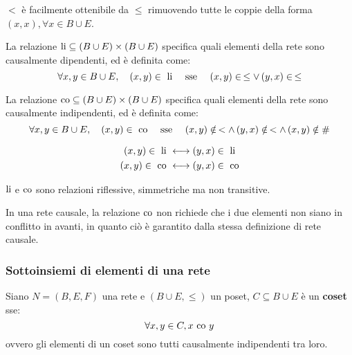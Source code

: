 \begin{rem}
    $<$ è facilmente ottenibile da $\le$ rimuovendo tutte le coppie della forma $(x,x), \forall x \in B \cup E$.
\end{rem}

\begin{defn}
    La relazione $\textnormal{li} \subseteq (B \cup E) \times (B \cup E)$ specifica quali elementi della rete sono causalmente dipendenti, ed è definita come: 
    \[
        \forall x, y \in B \cup E, \quad (x, y) \in \textnormal{ li} \quad \textnormal{ sse } \quad (x,y) \in \, \le \lor \, (y,x) \in \, \le
    \]
\end{defn}

\begin{defn}
    La relazione $\textnormal{co} \subseteq (B \cup E) \times (B \cup E)$ specifica quali elementi della rete sono causalmente indipendenti, ed è definita come: 
    \[
        \forall x, y \in B \cup E, \quad (x, y) \in \textnormal{ co} \quad \textnormal{ sse } \quad (x,y) \notin \, < \land \, (y,x) \notin \, < \land \, (x,y) \notin \#
    \]
\end{defn}

\begin{rem}
    \begin{align*}
        (x,y) \in \textnormal{ li } &\longleftrightarrow (y,x) \in \textnormal{ li}\\
        (x,y) \in \textnormal{ co } &\longleftrightarrow (y,x) \in \textnormal{ co}
    \end{align*}
\end{rem}
\begin{rem}
    $\textnormal{li}$ e $\textnormal{co}$ sono relazioni riflessive, simmetriche ma non transitive.
\end{rem}
\begin{rem}
    In una rete causale, la relazione $\textnormal{co}$ non richiede che i due elementi non siano in conflitto in avanti, in quanto ciò è garantito dalla stessa definizione di rete causale.
\end{rem}

\subsubsection{Sottoinsiemi di elementi di una rete}
\begin{defn}
    Siano $N = (B, E, F)$ una rete e $(B \cup E, \le)$ un poset, $C \subseteq B \cup E$ è un \textbf{coset} sse:
    \[
        \forall x, y \in C, x \textnormal{ co } y
    \]
    ovvero gli elementi di un coset sono tutti causalmente indipendenti tra loro. 
\end{defn}

